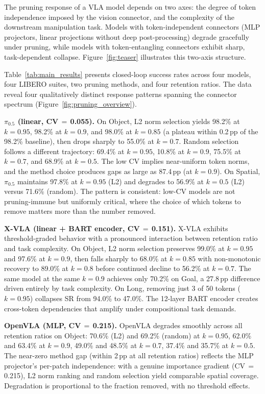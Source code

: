 The pruning response of a VLA model depends on two axes: the degree of token independence imposed by the vision connector, and the complexity of the downstream manipulation task. Models with token-independent connectors (MLP projectors, linear projections without deep post-processing) degrade gracefully under pruning, while models with token-entangling connectors exhibit sharp, task-dependent collapse. Figure~\ref{fig:teaser} illustrates this two-axis structure.

Table~\ref{tab:main_results} presents closed-loop success rates across four models, four LIBERO suites, two pruning methods, and four retention ratios. The data reveal four qualitatively distinct response patterns spanning the connector spectrum (Figure~\ref{fig:pruning_overview}).

\textbf{$\pi_0.5$ (linear, CV$\,{=}\,$0.055).} On Object, L2 norm selection yields 98.2\% at $k{=}0.95$, 98.2\% at $k{=}0.9$, and 98.0\% at $k{=}0.85$ (a plateau within 0.2\,pp of the 98.2\% baseline), then drops sharply to 55.0\% at $k{=}0.7$. Random selection follows a different trajectory: 69.4\% at $k{=}0.95$, 10.8\% at $k{=}0.9$, 75.5\% at $k{=}0.7$, and 68.9\% at $k{=}0.5$. The low CV implies near-uniform token norms, and the method choice produces gaps as large as 87.4\,pp (at $k{=}0.9$). On Spatial, $\pi_0.5$ maintains 97.8\% at $k{=}0.95$ (L2) and degrades to 56.9\% at $k{=}0.5$ (L2) versus 71.6\% (random). The pattern is consistent: low-CV models are not pruning-immune but uniformly critical, where the choice of which tokens to remove matters more than the number removed.

\textbf{X-VLA (linear + BART encoder, CV$\,{=}\,$0.151).} X-VLA exhibits threshold-graded behavior with a pronounced interaction between retention ratio and task complexity. On Object, L2 norm selection preserves 99.0\% at $k{=}0.95$ and 97.6\% at $k{=}0.9$, then falls sharply to 68.0\% at $k{=}0.85$ with non-monotonic recovery to 89.0\% at $k{=}0.8$ before continued decline to 56.2\% at $k{=}0.7$. The same model at the same $k{=}0.9$ achieves only 70.2\% on Goal, a 27.8\,pp difference driven entirely by task complexity. On Long, removing just 3 of 50 tokens ($k{=}0.95$) collapses SR from 94.0\% to 47.0\%. The 12-layer BART encoder creates cross-token dependencies that amplify under compositional task demands.

\textbf{OpenVLA (MLP, CV$\,{=}\,$0.215).} OpenVLA degrades smoothly across all retention ratios on Object: 70.6\% (L2) and 69.2\% (random) at $k{=}0.95$, 62.0\% and 63.4\% at $k{=}0.9$, 49.0\% and 48.5\% at $k{=}0.7$, 37.4\% and 35.7\% at $k{=}0.5$. The near-zero method gap (within 2\,pp at all retention ratios) reflects the MLP projector's per-patch independence: with a genuine importance gradient (CV$\,{=}\,$0.215), L2 norm ranking and random selection yield comparable spatial coverage. Degradation is proportional to the fraction removed, with no threshold effects.

